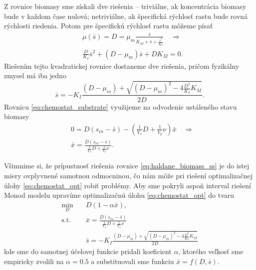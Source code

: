 Z rovnice biomasy sme získali dve riešenia -- triviálne, ak koncentrácia biomasy bude v každom čase nulová; netriviálne, ak špecifická rýchlosť rastu bude rovná rýchlosti riedenia. Potom pre špecifickú rýchlosť rastu môžeme písať 
\begin{align*}
	&\mu(\bar{s}) = D = \mu_{m}\frac{\bar{s}}{K_{M} + \bar{s} + \frac{\bar{s}^2}{K_{I}}} \quad \Longrightarrow \\
	&\frac{D}{K_{I}}\bar{s}^2 + (D-\mu_{m})\bar{s} + DK_{M} = 0.
\end{align*}
Riešením tejto kvadratickej rovnice dostaneme dve riešenia, pričom fyzikálny zmysel má iba jedno
\begin{equation}
	\bar{s} = -K_{I}\frac{\left(D-\mu_{m}\right) + \sqrt{\left(D-\mu_{m}\right)^2 - 4\frac{D^2}{K_{I}}K_{M}}}{2D}. \label{eq:haldane_subs_ss}
\end{equation}
Rovnicu \eqref{eq:chemostat_substrate} využijeme na odvodenie ustáleného stavu biomasy
\begin{equation}
	\begin{split}
		&0 = D\left(s_{in}-\bar{s}\right) - \left(\frac{1}{Y_{x}}D + \frac{1}{Y_{p}}\nu\right)\bar{x} \quad \Longrightarrow \\
		&\bar{x} = \frac{D\left(s_{in}-\bar{s}\right)}{\frac{1}{Y_{x}}D + \frac{1}{Y_{x}}\nu}. \label{eq:haldane_biomass_ss}
	\end{split}
\end{equation}

Všimnime si, že prípustnosť riešenia rovnice \eqref{eq:haldane_biomass_ss} je do istej miery ovplyvnené samotnou odmocninou, čo nám môže pri riešení optimalizačnej úlohy \eqref{eq:chemostat_opt} robiť problémy. Aby sme pokryli aspoň interval riešení Monod modelu upravíme optimalizačnú úlohu \eqref{eq:chemostat_opt} do tvaru
\begin{equation}
	\begin{split}
		\min_{D} &\quad D\left(1-\alpha\bar{x}\right), \\
		\text{s.t.} &\quad \bar{x} = \frac{D\left(s_{in}-\bar{s}\right)}{\frac{1}{Y_{x}}D + \frac{1}{Y_{x}}\nu} \\
		&\quad \bar{s} = -K_{I}\frac{\left(D-\mu_{m}\right) + \sqrt{\left(D-\mu_{m}\right)^2 - 4\frac{D^2}{K_{I}}K_{M}}}{2D}
	\end{split}
	\label{eq:chemostat_opt_w_ss}
\end{equation}
kde sme do samotnej účelovej funkcie pridali koeficient $ \alpha $, ktorého veľkosť sme empiricky zvolili na $ \alpha = 0.5 $ a substituovali sme funkciu $ \bar{x} = f(D,\bar{s}) $. 

